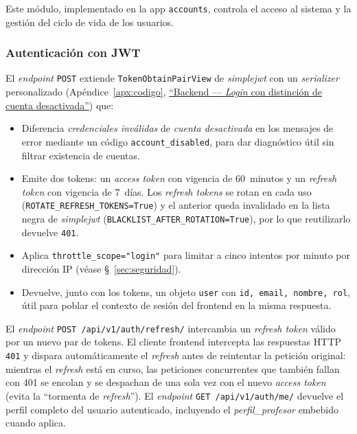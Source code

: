 Este módulo, implementado en la app \texttt{accounts}, controla el acceso al sistema y la gestión del ciclo de vida de los usuarios.

\subsubsection{Autenticación con JWT}

El \emph{endpoint} \texttt{POST}  extiende \texttt{TokenObtainPairView} de \emph{simplejwt} con un \emph{serializer} personalizado (Apéndice~\ref{apx:codigo}, \hyperref[lst:login_diff]{``Backend --- \emph{Login} con distinción de cuenta desactivada''}) que:

\begin{itemize}
    \item Diferencia \emph{credenciales inválidas} de \emph{cuenta desactivada} en los mensajes de error mediante un código \texttt{account\_disabled}, para dar diagnóstico útil sin filtrar existencia de cuentas.
    \item Emite dos tokens: un \emph{access token} con vigencia de 60~minutos y un \emph{refresh token} con vigencia de 7~días. Los \emph{refresh tokens} se rotan en cada uso (\texttt{ROTATE\_REFRESH\_TOKENS=True}) y el anterior queda invalidado en la lista negra de \emph{simplejwt} (\texttt{BLACKLIST\_AFTER\_ROTATION=True}), por lo que reutilizarlo devuelve \texttt{401}.
    \item Aplica \texttt{throttle\_scope="login"} para limitar a cinco intentos por minuto por dirección IP (véase \S~\ref{sec:seguridad}).
    \item Devuelve, junto con los tokens, un objeto \texttt{user} con \texttt{id, email, nombre, rol}, útil para poblar el contexto de sesión del frontend en la misma respuesta.
\end{itemize}

El \emph{endpoint} \texttt{POST /api/v1/auth/refresh/} intercambia un \emph{refresh token} válido por un nuevo par de tokens. El cliente frontend intercepta las respuestas HTTP \texttt{401} y dispara automáticamente el \emph{refresh} antes de reintentar la petición original: mientras el \emph{refresh} está en curso, las peticiones concurrentes que también fallan con 401 se encolan y se despachan de una sola vez con el nuevo \emph{access token} (evita la ``tormenta de \emph{refresh}''). El \emph{endpoint} \texttt{GET /api/v1/auth/me/} devuelve el perfil completo del usuario autenticado, incluyendo el \emph{perfil\_profesor} embebido cuando aplica.

